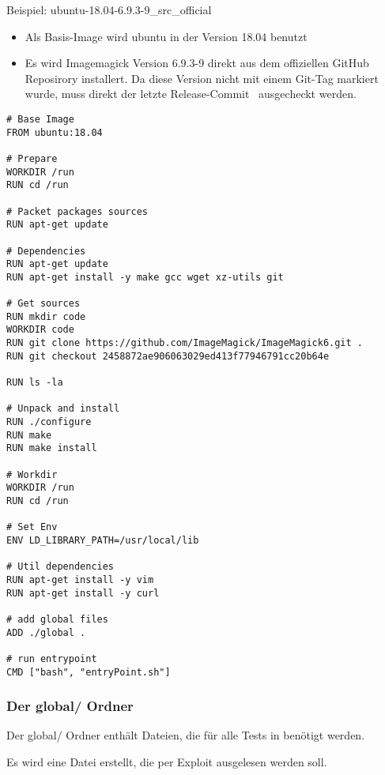 \newpage

Beispiel: ubuntu-18.04-6.9.3-9\_src\_official

\begin{itemize}
    \item Als Basis-Image wird ubuntu in der Version 18.04 benutzt
    \item Es wird Imagemagick Version 6.9.3-9 direkt aus dem offiziellen GitHub Reposirory installert.
    Da diese Version nicht mit einem Git-Tag markiert wurde,
    muss direkt der letzte Release-Commit~\cite{ReleaseImageMagick393-9} ausgecheckt werden.
\end{itemize}

\begin{lstlisting}[language=Docker, caption=Beispiel Dockerfile aus der Testsuite,label={lst:testsuiteexample}]
# Base Image
FROM ubuntu:18.04

# Prepare
WORKDIR /run
RUN cd /run

# Packet packages sources
RUN apt-get update

# Dependencies
RUN apt-get update
RUN apt-get install -y make gcc wget xz-utils git

# Get sources
RUN mkdir code
WORKDIR code
RUN git clone https://github.com/ImageMagick/ImageMagick6.git .
RUN git checkout 2458872ae906063029ed413f77946791cc20b64e

RUN ls -la

# Unpack and install
RUN ./configure
RUN make
RUN make install

# Workdir
WORKDIR /run
RUN cd /run

# Set Env
ENV LD_LIBRARY_PATH=/usr/local/lib

# Util dependencies
RUN apt-get install -y vim
RUN apt-get install -y curl

# add global files
ADD ./global .

# run entrypoint
CMD ["bash", "entryPoint.sh"]
\end{lstlisting}
\vspace{5mm}

\newpage

\subsubsection{Der global/ Ordner}

Der global/ Ordner enthält Dateien, die für alle Tests in benötigt werden.


Es wird eine Datei erstellt, die per Exploit ausgelesen werden soll.

